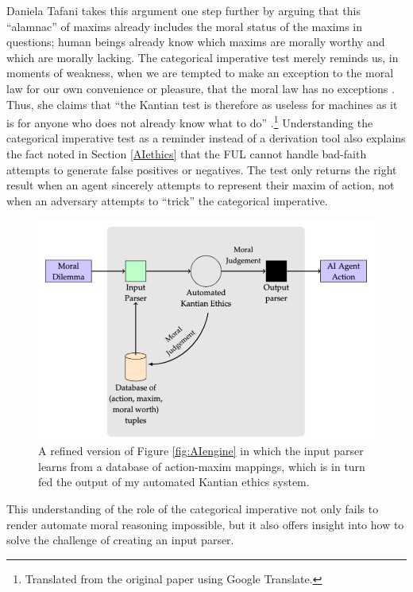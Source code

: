 \begin{isabellebody}
\begin{isamarkuptext}
Daniela Tafani takes this argument one step further by arguing that this ``alamnac'' of maxims already 
includes the moral status of the maxims in questions; human beings already
know which maxims are morally worthy and which are morally lacking. The categorical imperative test
merely reminds us, in moments of weakness, when we are tempted to make an exception to the moral law for 
our own convenience or pleasure, that the moral law has no exceptions \citep[9]{tafani}. Thus, she claims
that ``the Kantian test is therefore as useless for machines as it is for anyone who does
not already know what to do'' \citep[8]{tafani}.\footnote{Translated from the original paper using Google Translate.} 
Understanding the categorical imperative test as a reminder
instead of a derivation tool also explains the fact noted in Section \ref{AIethics} that the FUL cannot 
handle bad-faith attempts to generate false positives or negatives. The test only returns the right 
result when an agent sincerely attempts to represent their maxim of action, not when an adversary attempts
 to ``trick'' the categorical imperative.%
\end{isamarkuptext}\isamarkuptrue%
%
\begin{figure}
\centering
\includegraphics[scale=0.5]{inputparser.png}
\caption{A refined version of Figure \ref{fig:AIengine} in which the input parser learns from a database
of action-maxim mappings, which is in turn fed the output of my automated Kantian ethics system. } \label{fig:inputparser}
\end{figure}
%
\begin{isamarkuptext}%
This understanding of the role of the categorical imperative not only fails to render automate moral
reasoning impossible, but it also offers insight into how to solve the challenge of creating an input parser.

\end{isamarkuptext}
\end{isabellebody}
